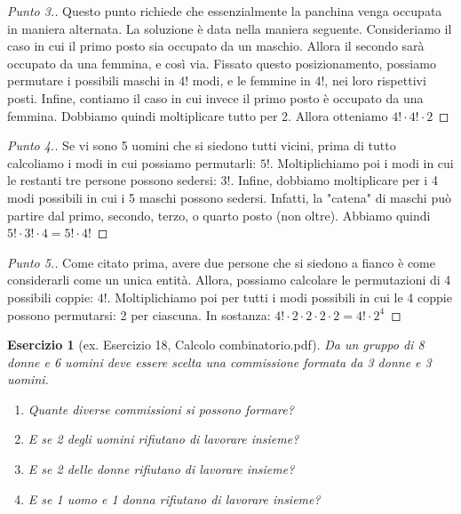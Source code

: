 \documentclass[12pt]{article}
\newtheorem{theorem}{Esercizio}
\renewcommand\qedsymbol{$\square$}
\begin{document}
\begin{proof}[Punto 3.]
	Questo punto richiede che essenzialmente la panchina venga occupata in maniera alternata. La soluzione è data nella maniera seguente. Consideriamo il caso in cui il primo posto sia occupato da un maschio. Allora il secondo sarà occupato da una femmina, e così via. Fissato questo posizionamento, possiamo permutare i possibili maschi in $4!$ modi, e le femmine in $4!$, nei loro rispettivi posti. Infine, contiamo il caso in cui invece il primo posto è occupato da una femmina. Dobbiamo quindi moltiplicare tutto per 2. Allora otteniamo $4! \cdot 4! \cdot 2$
\end{proof}

\begin{proof}[Punto 4.]
	Se vi sono 5 uomini che si siedono tutti vicini, prima di tutto calcoliamo i modi in cui possiamo permutarli: $5!$. Moltiplichiamo poi i modi in cui le restanti tre persone possono sedersi: $3!$. Infine, dobbiamo moltiplicare per i 4 modi possibili in cui i 5 maschi possono sedersi. Infatti, la "catena" di maschi può partire dal primo, secondo, terzo, o quarto posto (non oltre). Abbiamo quindi $5! \cdot 3! \cdot 4 = 5! \cdot 4!$
\end{proof}

\renewcommand\qedsymbol{$\blacksquare$}

\begin{proof}[Punto 5.]
	Come citato prima, avere due persone che si siedono a fianco è come considerarli come un unica entità. Allora, possiamo calcolare le permutazioni di 4 possibili coppie: $4!$. Moltiplichiamo poi per tutti i modi possibili in cui le 4 coppie possono permutarsi: 2 per ciascuna. In sostanza: $4! \cdot 2 \cdot 2 \cdot 2 \cdot 2 = 4! \cdot 2^4$
\end{proof}

\begin{theorem}[ex. Esercizio 18, Calcolo combinatorio.pdf]
	Da un gruppo di 8 donne e 6 uomini deve essere scelta una commissione formata da 3 donne e 3 uomini.
	\begin{enumerate}
		\item Quante diverse commissioni si possono formare?
		\item E se 2 degli uomini rifiutano di lavorare insieme?
		\item E se 2 delle donne rifiutano di lavorare insieme?
		\item E se 1 uomo e 1 donna rifiutano di lavorare insieme?
	\end{enumerate}
\end{theorem}
\end{document}
